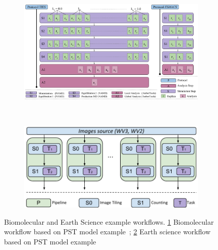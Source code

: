 \begin{figure}[ht!]
    \centering
    \begin{subfigure}[b]{0.45\textwidth}
        \includegraphics[width=\linewidth]{figures/bio_workflow.pdf}
        \caption{}
        \label{fig:bio_workflow}
    \end{subfigure}%
    ~ 
    \begin{subfigure}[b]{0.45\textwidth}
        \includegraphics[width=\linewidth]{figures/earth_workflow.pdf}
        \caption{}
        \label{fig:earth_workflow}
    \end{subfigure}
    \caption{Biomolecular and Earth Science example workflows. \ref{fig:bio_workflow} Biomolecular workflow based on PST model example~\cite{dakka2018concurrent}; \ref{fig:earth_workflow} Earth science workflow based on PST model example~\cite{paraskevakos2019workflow}}\label{fig:bio_earth_workflows}
\end{figure}

